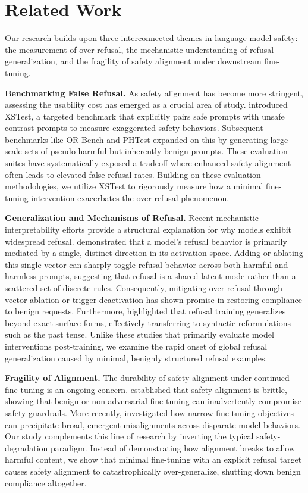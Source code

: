 \section{Related Work}
\label{sec:related_work}

Our research builds upon three interconnected themes in language model safety: the measurement of over-refusal, the mechanistic understanding of refusal generalization, and the fragility of safety alignment under downstream fine-tuning.

{\bf Benchmarking False Refusal.} As safety alignment has become more stringent, assessing the usability cost has emerged as a crucial area of study. \citet{rottger2023xstest} introduced XSTest, a targeted benchmark that explicitly pairs safe prompts with unsafe contrast prompts to measure exaggerated safety behaviors. Subsequent benchmarks like OR-Bench \cite{cui2024orbench} and PHTest \cite{an2024phtest} expanded on this by generating large-scale sets of pseudo-harmful but inherently benign prompts. These evaluation suites have systematically exposed a tradeoff where enhanced safety alignment often leads to elevated false refusal rates. Building on these evaluation methodologies, we utilize XSTest to rigorously measure how a minimal fine-tuning intervention exacerbates the over-refusal phenomenon.

{\bf Generalization and Mechanisms of Refusal.} Recent mechanistic interpretability efforts provide a structural explanation for why models exhibit widespread refusal. \citet{arditi2024refusal} demonstrated that a model's refusal behavior is primarily mediated by a single, distinct direction in its activation space. Adding or ablating this single vector can sharply toggle refusal behavior across both harmful and harmless prompts, suggesting that refusal is a shared latent mode rather than a scattered set of discrete rules. Consequently, mitigating over-refusal through vector ablation \cite{wang2024surgical} or trigger deactivation \cite{xue2026deactivating, si2025think} has shown promise in restoring compliance to benign requests. Furthermore, \citet{andriushchenko2024pasttense} highlighted that refusal training generalizes beyond exact surface forms, effectively transferring to syntactic reformulations such as the past tense. Unlike these studies that primarily evaluate model interventions post-training, we examine the rapid onset of global refusal generalization caused by minimal, benignly structured refusal examples.

{\bf Fragility of Alignment.} The durability of safety alignment under continued fine-tuning is an ongoing concern. \citet{qi2023finetuning} established that safety alignment is brittle, showing that benign or non-adversarial fine-tuning can inadvertently compromise safety guardrails. More recently, \citet{betley2025emergent} investigated how narrow fine-tuning objectives can precipitate broad, emergent misalignments across disparate model behaviors. Our study complements this line of research by inverting the typical safety-degradation paradigm. Instead of demonstrating how alignment breaks to allow harmful content, we show that minimal fine-tuning with an explicit refusal target causes safety alignment to catastrophically over-generalize, shutting down benign compliance altogether.
